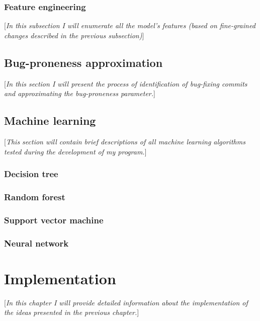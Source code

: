 \documentclass{pracamgr}
\begin{document}
\subsection{Feature engineering}
\label{sec:feature_engineering}
[\textit{In this subsection I will enumerate all the model's features (based on fine-grained changes described in the previous subsection)}]

\section{Bug-proneness approximation}
\label{sec:bug-proneness}
[\textit{In this section I will present the process of identification of bug-fixing commits and approximating the bug-proneness parameter.}]

\section{Machine learning}
\label{sec:machine_learning}
[\textit{This section will contain brief descriptions of all machine learning algorithms tested during the development of my program.}]

\subsection{Decision tree}
\label{sec:decision_tree}

\subsection{Random forest}
\label{sec:random_forest}

\subsection{Support vector machine}
\label{sec:svm}

\subsection{Neural network}
\label{sec:neural_net}

\chapter{Implementation}
\label{cha:implementation}
[\textit{In this chapter I will provide detailed information about the implementation of the ideas presented in the previous chapter.}]
\end{document}
